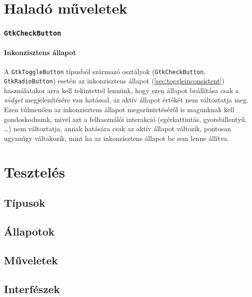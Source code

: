 \section{Haladó műveletek}

\subsubsection{\texttt{GtkCheckButton}}

\paragraph{Inkonzisztens állapot}

A \texttt{GtkToggleButton} típusból származó osztályok (\texttt{GtkCheckButton}, \texttt{GtkRadioButton}) esetén az inkonzisztens állapot (\ref{sec:toggleinconsistent}) használatakor arra kell tekintettel lennünk, hogy ezen állapot beállítása csak a \textit{widget} megjelenítésére van hatással, az aktív állapot értékét nem változtatja meg. Ezen túlmenően az inkonzisztens állapot megszüntetéséről is magunknak kell gondoskodnunk, mivel azt a felhasználói interakció (egérkattintás, gyorsbillentyű, \dots) nem változtatja, annak hatására csak az aktív állapot változik, pontosan ugyanúgy váltakozik, mint ha az inkonzisztens állapot be sem lenne állítva. 


%
%

\section{Tesztelés}

\subsection{Típusok}
\subsection{Állapotok}
\subsection{Műveletek}
\subsection{Interfészek}
